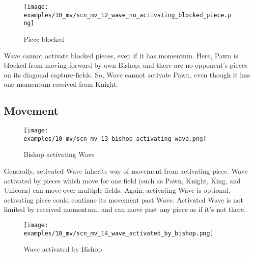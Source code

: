 \vspace*{-1.4\baselineskip}
\noindent
\begin{figure}[h]
\texttt{[image: examples/10\_mv/scn\_mv\_12\_wave\_no\_activating\_blocked\_piece.png]}
\caption{Piece blocked}
\label{fig:scn_mv_12_wave_no_activating_blocked_piece}
\end{figure}

Wave cannot activate blocked pieces, even if it has momentum. Here, Pawn is blocked
from moving forward by own Bishop, and there are no opponent's pieces on its
diagonal capture-fields. So, Wave cannot activate Pawn, even though it has one
momentum received from Knight.

\clearpage %

\subsection*{Movement}
\label{sec:Miranda's veil/Wave/Movement}

\vspace*{-1.4\baselineskip}
\noindent
\begin{figure}[h]
\texttt{[image: examples/10\_mv/scn\_mv\_13\_bishop\_activating\_wave.png]}
\caption{Bishop activating Wave}
\label{fig:scn_mv_13_bishop_activating_wave}
\end{figure}

Generally, activated Wave inherits way of movement from activating piece. Wave activated
by pieces which move for one field (such as Pawn, Knight, King, and Unicorn) can move
over multiple fields. Again, activating Wave is optional, activating piece could continue
its movement past Wave. Activated Wave is not limited by received momentum, and can move
past any piece as if it's not there.

\clearpage %

\vspace*{-2.1\baselineskip}
\noindent
\begin{figure}[!h]
\texttt{[image: examples/10\_mv/scn\_mv\_14\_wave\_activated\_by\_bishop.png]}
\caption{Wave activated by Bishop}
\label{fig:scn_mv_14_wave_activated_by_bishop}
\end{figure}


